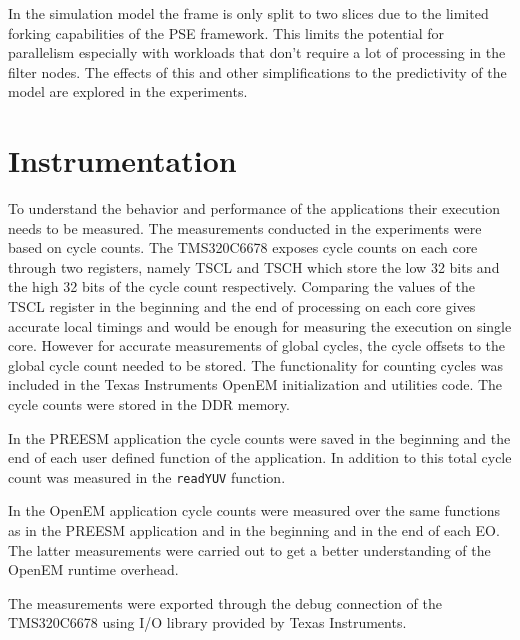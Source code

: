 In the simulation model the frame is only split to two slices due to the limited
forking capabilities of the PSE framework. This limits the potential for
parallelism especially with workloads that don't require a lot of processing in
the filter nodes. The effects of this and other simplifications to the
predictivity of the model are explored in the experiments.

\section{Instrumentation}
\label{sec:instrumentation}
To understand the behavior and performance of the applications their execution
needs to be measured. The measurements conducted in the experiments were based
on cycle counts. The TMS320C6678 exposes cycle counts on each core through two
registers, namely TSCL and TSCH which store the low 32 bits and the high 32 bits
of the cycle count respectively. Comparing the values of the TSCL register in
the beginning and the end of processing on each core gives accurate local
timings and would be enough for measuring the execution on single core. However
for accurate measurements of global cycles, the cycle offsets to the global
cycle count needed to be stored. The functionality for counting cycles was
included in the Texas Instruments OpenEM initialization and utilities code. The
cycle counts were stored in the DDR memory.

In the PREESM application the cycle counts were saved in the beginning and the
end of each user defined function of the application. In addition to this total
cycle count was measured in the \texttt{readYUV} function.

In the OpenEM application cycle counts were measured over the same functions as
in the PREESM application and in the beginning and in the end of each EO. The
latter measurements were carried out to get a better understanding of the OpenEM
runtime overhead.

The measurements were exported through the debug connection of the TMS320C6678
using I/O library provided by Texas Instruments.
